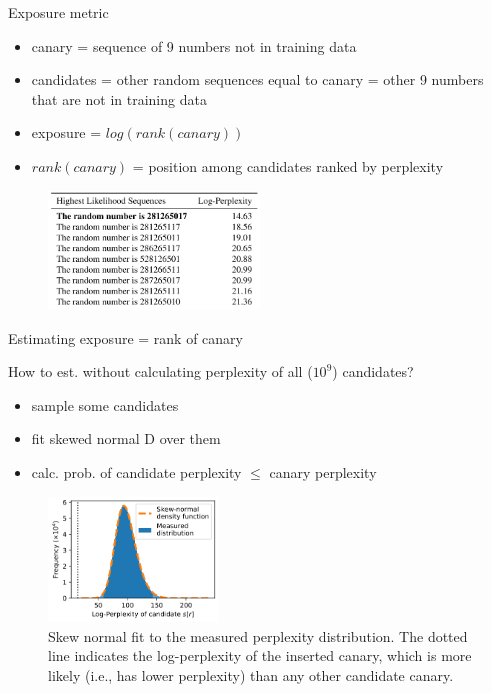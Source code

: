\documentclass{beamer}
\begin{document}
\begin{frame}{Exposure metric}

\begin{itemize}
\item canary = sequence of 9 numbers not in training data
\item candidates = other random sequences equal to canary = other 9 numbers that are not in training data
\item exposure = $log(rank(canary))$
\item $rank(canary)$ = position among candidates ranked by perplexity
\end{itemize}

\begin{figure}[h]
\includegraphics[width=0.5\textwidth]{img/rank}
\end{figure}


\end{frame}
\begin{frame}{Estimating exposure = rank of canary}

How to est. without calculating perplexity of all ($10^9$) candidates?
\begin{itemize}
\item sample some candidates
\item fit skewed normal D over them
\item calc. prob. of candidate perplexity $\leq$ canary perplexity
\end{itemize}

\begin{figure}[h]
\includegraphics[width=0.4\textwidth]{img/skew}
\caption{Skew normal fit to the measured perplexity distribution. The dotted line indicates the log-perplexity of the inserted canary, which is more likely (i.e., has lower perplexity) than any other candidate canary.}
\end{figure}

\end{frame}
\end{document}
